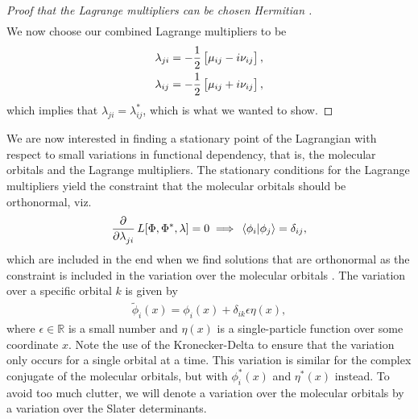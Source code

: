 \begin{proof}[%
                    Proof that the Lagrange multipliers can be chosen Hermitian%
                ]
\begin{align}
                \end{align}
                We now choose our combined Lagrange multipliers to be
                \begin{align}
                    \lambda_{ji} &=
                    -\frac{1}{2}\left[ 
                        \mu_{ij} - i\nu_{ij}
                     \right], \\
                    \lambda_{ij} &=
                    -\frac{1}{2}\left[ 
                        \mu_{ij} + i\nu_{ij}
                     \right],
                \end{align}
                which implies that $\lambda_{ji} = \lambda_{ij}^{*}$, which is
                what we wanted to show.
            \end{proof}

            We are now interested in finding a stationary point of the
            Lagrangian with respect to small variations in functional
            dependency, that is, the molecular orbitals and the Lagrange
            multipliers.
            The stationary conditions for the Lagrange multipliers yield the
            constraint that the molecular orbitals should be orthonormal, viz.
            \begin{gather}
                \dpd{}{\lambda_{ji}}\lagrangianfunc{\slat, \slat^{*}, \lambda}
                = 0
                \implies
                \braket*{\phi_i}{\phi_j} = \delta_{ij},
            \end{gather}
            which are included in the end when we find solutions that are
            orthonormal as the constraint is included in the variation over the
            molecular orbitals \cite{kvaal2017notes}.
            The variation over a specific orbital $k$ is given by
            \begin{align}
                \tilde{\phi}_i(x) = \phi_{i}(x) + \delta_{ik}\epsilon\eta(x),
            \end{align}
            where $\epsilon \in \mathbb{R}$ is a small number and $\eta(x)$ is a
            single-particle function over some coordinate $x$.
            Note the use of the Kronecker-Delta to ensure that the variation
            only occurs for a single orbital at a time.
            This variation is similar for the complex conjugate of the
            molecular orbitals, but with $\phi^{*}_i(x)$ and $\eta^{*}(x)$
            instead.
            To avoid too much clutter, we will denote a variation over the
            molecular orbitals by a variation over the Slater determinants.
